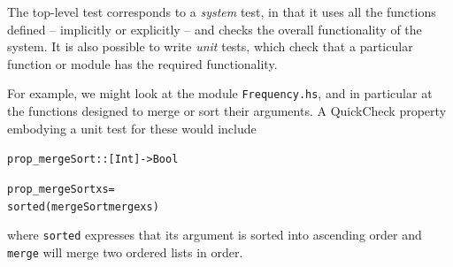The top-level test corresponds to a \emph{system} test, in that it uses all the functions defined -- implicitly or explicitly -- and checks the overall functionality of the system. It is also possible to write \emph{unit} tests, which check that a particular function or module has the required functionality.

For example, we might look at the module \texttt{Frequency.hs}, and in particular at the functions designed to merge or sort their arguments. A QuickCheck property embodying a unit test for these would include
\begin{alltt}
prop_mergeSort :: [Int] -> Bool

prop_mergeSort xs =
    sorted (mergeSort merge xs) 
\end{alltt}
where \texttt{sorted} expresses that its argument is sorted into ascending order and \texttt{merge} will merge two ordered lists in order.




